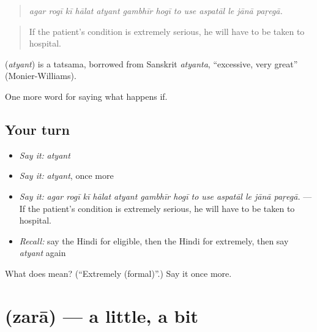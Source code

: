 \begin{quote}
\emph{agar rogī kī hālat atyant gambhīr hogī to use aspatāl le jānā paṛegā.}
\end{quote}

\begin{quote}
If the patient's condition is extremely serious, he will have to be taken to hospital.
\end{quote}

\begin{cousinweb}
\textbf{} (\emph{atyant}) is a tatsama, borrowed from Sanskrit \emph{atyanta}, \textquotedblleft{}excessive, very great\textquotedblright{} (Monier-Williams).
\end{cousinweb}

\begin{grammarlens}[title={What you've built}]
One more word for saying what happens if.
\end{grammarlens}

\subsection*{Your turn}
\begin{itemize}
\raggedright
  \item \emph{Say it:} \emph{atyant}
  \item \emph{Say it:} \emph{atyant}, once more
  \item \emph{Say it:} \emph{agar rogī kī hālat atyant gambhīr hogī to use aspatāl le jānā paṛegā.} — If the patient's condition is extremely serious, he will have to be taken to hospital.
  \item \emph{Recall:} say the Hindi for eligible, then the Hindi for extremely, then say \emph{atyant} again
\end{itemize}

\begin{tcolorbox}[breakable,colback=teal!4,colframe=teal!35!black,title={Before you move on}]
What does  mean? (\textquotedblleft{}Extremely (formal)\textquotedblright{}.) Say it once more.
\end{tcolorbox}
\section[\texorpdfstring{\hi{ज़रा} (zarā)}{ज़रा (zarā)}]{ (zarā) — a little, a bit}

\label{lesson:HI-C387-zara}




